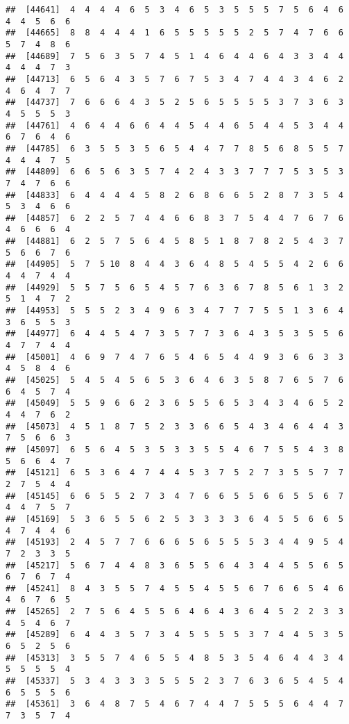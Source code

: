 \documentclass[
]{book}
\begin{document}
\begin{verbatim}
##  [44641]  4  4  4  4  6  5  3  4  6  5  3  5  5  5  7  5  6  4  6  4  4  5  6  6
##  [44665]  8  8  4  4  4  1  6  5  5  5  5  5  2  5  7  4  7  6  6  5  7  4  8  6
##  [44689]  7  5  6  3  5  7  4  5  1  4  6  4  4  6  4  3  3  4  4  4  4  4  7  3
##  [44713]  6  5  6  4  3  5  7  6  7  5  3  4  7  4  4  3  4  6  2  4  6  4  7  7
##  [44737]  7  6  6  6  4  3  5  2  5  6  5  5  5  5  3  7  3  6  3  4  5  5  5  3
##  [44761]  4  6  4  4  6  6  4  4  5  4  4  6  5  4  4  5  3  4  4  6  7  6  4  6
##  [44785]  6  3  5  5  3  5  6  5  4  4  7  7  8  5  6  8  5  5  7  4  4  4  7  5
##  [44809]  6  6  5  6  3  5  7  4  2  4  3  3  7  7  7  5  3  5  3  7  4  7  6  6
##  [44833]  6  4  4  4  4  5  8  2  6  8  6  6  5  2  8  7  3  5  4  5  3  4  6  6
##  [44857]  6  2  2  5  7  4  4  6  6  8  3  7  5  4  4  7  6  7  6  4  6  6  6  4
##  [44881]  6  2  5  7  5  6  4  5  8  5  1  8  7  8  2  5  4  3  7  5  6  6  7  6
##  [44905]  5  7  5 10  8  4  4  3  6  4  8  5  4  5  5  4  2  6  6  4  4  7  4  4
##  [44929]  5  5  7  5  6  5  4  5  7  6  3  6  7  8  5  6  1  3  2  5  1  4  7  2
##  [44953]  5  5  5  2  3  4  9  6  3  4  7  7  7  5  5  1  3  6  4  3  6  5  5  3
##  [44977]  6  4  4  5  4  7  3  5  7  7  3  6  4  3  5  3  5  5  6  4  7  7  4  4
##  [45001]  4  6  9  7  4  7  6  5  4  6  5  4  4  9  3  6  6  3  3  4  5  8  4  6
##  [45025]  5  4  5  4  5  6  5  3  6  4  6  3  5  8  7  6  5  7  6  6  4  5  7  4
##  [45049]  5  5  9  6  6  2  3  6  5  5  6  5  3  4  3  4  6  5  2  4  4  7  6  2
##  [45073]  4  5  1  8  7  5  2  3  3  6  6  5  4  3  4  6  4  4  3  7  5  6  6  3
##  [45097]  6  5  6  4  5  3  5  3  3  5  5  4  6  7  5  5  4  3  8  5  6  6  4  7
##  [45121]  6  5  3  6  4  7  4  4  5  3  7  5  2  7  3  5  5  7  7  2  7  5  4  4
##  [45145]  6  6  5  5  2  7  3  4  7  6  6  5  5  6  6  5  5  6  7  4  4  7  5  7
##  [45169]  5  3  6  5  5  6  2  5  3  3  3  3  6  4  5  5  6  6  5  4  7  4  4  6
##  [45193]  2  4  5  7  7  6  6  6  5  6  5  5  5  3  4  4  9  5  4  7  2  3  3  5
##  [45217]  5  6  7  4  4  8  3  6  5  5  6  4  3  4  4  5  5  6  5  6  7  6  7  4
##  [45241]  8  4  3  5  5  7  4  5  5  4  5  5  6  7  6  6  5  4  6  4  6  7  6  5
##  [45265]  2  7  5  6  4  5  5  6  4  6  4  3  6  4  5  2  2  3  3  4  5  4  6  7
##  [45289]  6  4  4  3  5  7  3  4  5  5  5  5  3  7  4  4  5  3  5  6  5  2  5  6
##  [45313]  3  5  5  7  4  6  5  5  4  8  5  3  5  4  6  4  4  3  4  5  5  5  5  4
##  [45337]  5  3  4  3  3  3  5  5  5  2  3  7  6  3  6  5  4  5  4  6  5  5  5  6
##  [45361]  3  6  4  8  7  5  4  6  7  4  4  7  5  5  5  6  4  4  7  7  3  5  7  4

\end{verbatim}
\end{document}
